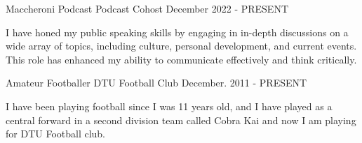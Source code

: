 

\begin{cventries}

  \cventry
    {Maccheroni Podcast} %
    {Podcast Cohost} %
    {} %
    {December 2022 - PRESENT} %
    {
      \begin{cvitems} %
        \item {I have honed my public speaking skills by engaging in in-depth discussions on a wide array of topics, including culture, personal development, and current events. This role has enhanced my ability to communicate effectively and think critically.}
      \end{cvitems}
    }

  \cventry
    {Amateur Footballer} %
    {DTU Football Club} %
    {} %
    {December. 2011 - PRESENT} %
    {
      \begin{cvitems} %
        \item {I have been playing football since I was 11 years old, and I have played as a central forward in a second division team called Cobra Kai and now I am playing for DTU Football club.}
      \end{cvitems}
    }

\end{cventries}
